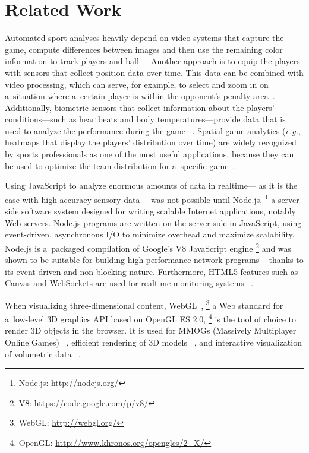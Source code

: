 \documentclass{sig-alternate}
\newcommand{\inlinelistingsize}{\fontsize{8pt}{11pt}}
\let\oldurl\url
\renewcommand{\url}[1]{\inlinelistingsize\oldurl{#1}}
\begin{document}
\section{Related Work}
\label{sec:related-work}

Automated sport analyses heavily depend on video systems
that capture the game, compute differences between images
and then use the remaining color information
to track players and ball%
~\cite{Huang:2007:PBD:1776594.1776646,Liang:2005:SBD:2163110.2163186}.
Another approach is to equip the players with sensors
that collect position data over time.
This data can be combined with video processing,
which can serve, for example,
to select and zoom in on a~situation where a~certain player
is within the opponent's penalty area~\cite{ragnar2012football}.
Additionally, biometric sensors that collect information
about the players' conditions---such as heartbeats
and body temperatures---provide data that is used
to analyze the performance during the game~%
\cite{alonso2010sportstelemetry}.
Spatial game analytics (\emph{e.g.}, heatmaps
that display the players' distribution over time)
are widely recognized by sports professionals
as one of the most useful applications,
because they can be used to optimize the team distribution
for a~specific game~\cite{elnasr2013spatialgame}.

Using JavaScript to analyze enormous amounts of data in realtime---%
as it is the case with high accuracy sensory data---%
was not possible until Node.js,%
\footnote{Node.js: \url{http://nodejs.org/}}
a server-side software system designed for
writing scalable Internet applications, notably Web servers.
Node.js programs are written on the server side
in JavaScript, using event-driven, asynchronous I/O
to minimize overhead and maximize scalability.
Node.js is a~packaged compilation of Google's V8 JavaScript engine%
\footnote{V8: \url{https://code.google.com/p/v8/}}
and was shown to be suitable for building
high-performance network programs%
~\cite{tilkov2010node}
thanks to its event-driven and non-blocking nature.
Furthermore, HTML5 features such as Canvas and WebSockets
are used for realtime monitoring systems%
~\cite{cha2013developing}.

When visualizing three-dimensional content,
WebGL~\cite{webgl},%
\footnote{WebGL: \url{http://webgl.org/}}
a Web standard for a~low-level 3D graphics API
based on OpenGL ES 2.0,%
\footnote{OpenGL: \url{http://www.khronos.org/opengles/2_X/}}
is the tool of choice to render 3D objects
in the browser.
It is used for MMOGs (Massively Multiplayer Online Games)%
~\cite{chenwebgl},
efficient rendering of 3D models%
~\cite{sawicki2013efficient},
and interactive visualization of volumetric data%
~\cite{congote2011interactive}.
\end{document}
